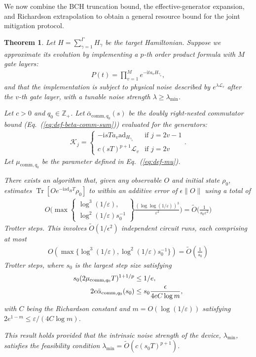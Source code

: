 \documentclass[aps,pra,reprint,groupedaddress,floatfix]{revtex4-2}
\newtheorem{theorem}{Theorem}
\newcommand{\eq}[1]{(\ref{eq:#1})}
\renewcommand{\i}{\mathrm{i}}
\renewcommand{\L}{\mathcal{L}}
\newcommand{\ad}{\mathrm{ad}}
\newcommand{\eps}{\varepsilon}
\newcommand{\mb}{\mathbb}
\begin{document}
We now combine the BCH truncation bound, the effective-generator expansion, and Richardson extrapolation to obtain a general resource bound for the joint mitigation protocol.
\begin{theorem}
\label{thm:general-application}
    Let $H = \sum_{\gamma = 1}^{\Gamma} H_{\gamma}$ be the target Hamiltonian. Suppose we approximate its evolution by implementing a $p$-th order product formula with $M$ gate layers:
    \begin{align*}
        P(t) = \prod_{v=1}^M e^{-\i t a_v H_{\gamma_v}},
    \end{align*}
    and that the implementation is subject to physical noise described by $e^{\lambda \L_v}$ after the $v$-th gate layer, with a tunable noise strength $\lambda \ge \lambda_{\min}$.
    
    Let $c>0$ and $q_0\in \mb Z_+$. Let $\bar{\alpha}_{\mathrm{comm},q_0}(s)$ be the doubly right-nested commutator bound (Eq.~\eq{def-beta-comm-sum}) evaluated for the generators:
    \begin{align*}
        \mathcal{K}_j= \begin{cases}-\i sT a_{v}\ad_{H_{\gamma_v}} & \text{if } j = 2v-1\\ c(sT)^{p+1}\mathcal{L}_v & \text{if } j = 2v \end{cases}.
    \end{align*}
    Let $\mu_{\mathrm{comm},q_0}$ be the parameter defined in Eq.~\eq{def-mu}. 
    
    There exists an algorithm that, given any observable $O$ and initial state $\rho_0$, estimates $\operatorname{Tr}[O e^{-\i \ad_H T}\rho_0]$ to within an additive error of $\epsilon\|O\|$ using a total of
    \begin{align*}
        O\Big( \max\left\{
         \begin{gathered}
         \log^3(1/\eps),\\
         \log^2(1/\eps)s_0^{-1}
         \end{gathered}
         \right\}\frac{(\log\log (1/\eps))^3}{\eps^2}\Big)  = \widetilde{O}\Big(\frac{1}{s_0 \eps^2}\Big)
    \end{align*}
    Trotter steps. This involves $\widetilde{O}(1/\epsilon^2)$ independent circuit runs, each comprising at most
    \begin{align*}
        O( \max\{\log^3(1/\eps), \log^2(1/\eps)s_0^{-1}\}) = \widetilde{O}\left( \frac{1}{s_0} \right)
    \end{align*}
    Trotter steps,
    where $s_0$ is the largest step size satisfying
    \begin{align}
    \label{eq:s0-general}
       s_0 (2\mu_{\mathrm{comm},q_0}T)^{1+1/p}
       &\le 1/e, \notag\\
       2e \bar{\alpha}_{\mathrm{comm},q_0}(s_0)
       &\le s_0 \frac{\epsilon}{4eC\log m},
    \end{align}
    with $C$ being the Richardson constant and $m = O(\log(1/\eps))$ satisfying $2e^{1-m} \le \eps /(4C\log m)$.
    
    This result holds provided that the intrinsic noise strength of the device, $\lambda_{\min}$, satisfies the feasibility condition $\lambda_{\min} = \widetilde{O}(c (s_0 T)^{p+1})$.
\end{theorem}
\end{document}
